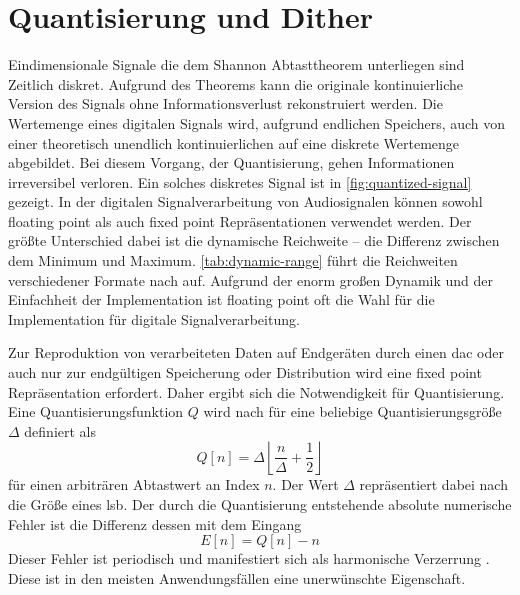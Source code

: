 
\cleartoleftpage

\thispagestyle{empty}
\vspace*{\fill}
\newpage

\onehalfspacing
{}
\setcounter{page}{1}
\pagestyle{scrheadings}

\section{Quantisierung und Dither}

Eindimensionale Signale die dem Shannon Abtasttheorem \autocite{shannon} unterliegen sind Zeitlich diskret.
Aufgrund des Theorems kann die originale kontinuierliche Version des Signals ohne Informationsverlust rekonstruiert werden.
Die Wertemenge eines digitalen Signals wird, aufgrund endlichen Speichers, auch von einer theoretisch unendlich kontinuierlichen auf eine diskrete Wertemenge abgebildet.
Bei diesem Vorgang, der Quantisierung, gehen Informationen irreversibel verloren.
Ein solches diskretes Signal ist in \autoref{fig:quantized-signal} gezeigt.
In der digitalen Signalverarbeitung von Audiosignalen können sowohl \gls{floating point} als auch \gls{fixed point} Repräsentationen verwendet werden.
Der größte Unterschied dabei ist die dynamische Reichweite -- die Differenz zwischen dem Minimum und Maximum.
\autoref{tab:dynamic-range} führt die Reichweiten verschiedener Formate nach \autocite{32bit} auf.
Aufgrund der enorm großen Dynamik und der Einfachheit der Implementation ist \gls{floating point} oft die Wahl für die Implementation für digitale Signalverarbeitung.

Zur Reproduktion von verarbeiteten Daten auf Endgeräten durch einen \gls{dac} oder auch nur zur endgültigen Speicherung oder Distribution wird eine \gls{fixed point} Repräsentation erfordert.
Daher ergibt sich die Notwendigkeit für Quantisierung.
Eine Quantisierungsfunktion $Q$ wird nach \autocite{dither} für eine beliebige Quantisierungsgröße $\Delta$ definiert als
\begin{equation}
Q[n] = \Delta \left\lfloor \frac{n}{\Delta} + \frac{1}{2} \right\rfloor
\end{equation}
für einen arbiträren Abtastwert an Index $n$.
Der Wert $\Delta$ repräsentiert dabei nach \autocite{dither} die Größe eines \gls{lsb}.
Der durch die Quantisierung entstehende absolute numerische Fehler ist die Differenz dessen mit dem Eingang
\begin{equation}
E[n] = Q[n] - n
\end{equation}
Dieser Fehler ist periodisch und manifestiert sich als harmonische Verzerrung \autocites{dither}{noise-shaping}.
Diese ist in den meisten Anwendungsfällen eine unerwünschte Eigenschaft.

